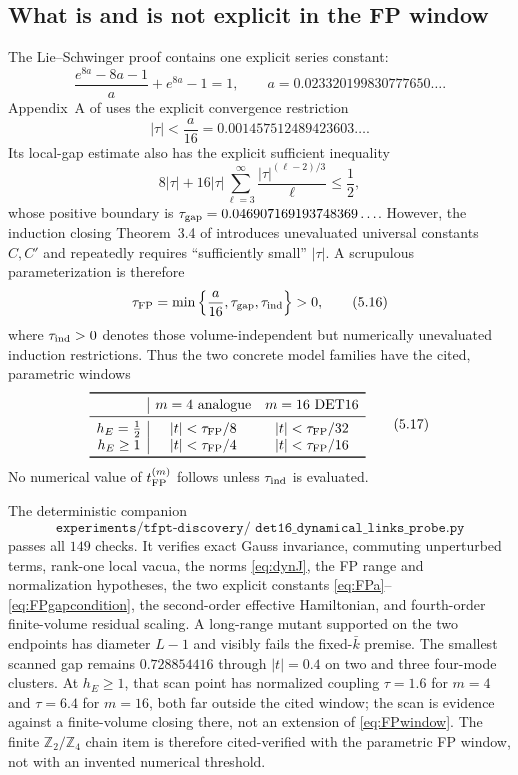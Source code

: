 \documentclass[11pt]{article}
\theoremstyle{remark}
\begin{document}
\subsection{What is and is not explicit in the FP window}

The Lie--Schwinger proof contains one explicit series constant:
\[
 \frac{e^{8a}-8a-1}{a}+e^{8a}-1=1,\qquad
 a=0.023320199830777650\ldots .
\tag{5.14}\label{eq:FPa}
\]
Appendix~A of \cite{FP2020} uses the explicit convergence restriction
\[
 |\tau|<\frac a{16}
 =0.001457512489423603\ldots .
\]
Its local-gap estimate also has the explicit sufficient inequality
\[
 8|\tau|+16|\tau|
 \sum_{\ell=3}^{\infty}
 \frac{|\tau|^{(\ell-2)/3}}{\ell}\leq\frac12,
\tag{5.15}\label{eq:FPgapcondition}
\]
whose positive boundary is
$\tau_{\rm gap}=0.046907169193748369\ldots$.
However, the induction closing Theorem~3.4 of \cite{FP2020} introduces
unevaluated universal constants $C,C'$ and repeatedly requires
``sufficiently small'' $|\tau|$.  A scrupulous parameterization is
therefore
\[
 \tau_{\rm FP}
 =\min\left\{\frac a{16},\tau_{\rm gap},\tau_{\rm ind}\right\}>0,
\tag{5.16}\label{eq:FPparametric}
\]
where $\tau_{\rm ind}>0$ denotes those volume-independent but
numerically unevaluated induction restrictions.  Thus the two concrete
model families have the cited, parametric windows
\[
\begin{array}{c|cc}
\toprule
&m=4\ \text{analogue}&m=16\ \text{DET16}\\
\midrule
h_E=\tfrac12&|t|<\tau_{\rm FP}/8&|t|<\tau_{\rm FP}/32\\
h_E\geq1&|t|<\tau_{\rm FP}/4&|t|<\tau_{\rm FP}/16\\
\bottomrule
\end{array}
\tag{5.17}\label{eq:FPwindows}
\]
No numerical value of $t_{\rm FP}^{(m)}$ follows unless
$\tau_{\rm ind}$ is evaluated.

The deterministic companion
\[
 \texttt{experiments/tfpt-discovery/
 det16\_dynamical\_links\_probe.py}
\]
passes all $149$ checks.  It verifies exact Gauss invariance, commuting
unperturbed terms, rank-one local vacua, the norms
\eqref{eq:dynJ}, the FP range and normalization hypotheses, the two
explicit constants \eqref{eq:FPa}--\eqref{eq:FPgapcondition}, the
second-order effective Hamiltonian, and fourth-order finite-volume
residual scaling.  A long-range mutant supported on the two endpoints
has diameter $L-1$ and visibly fails the fixed-$\bar k$ premise.
The smallest scanned gap remains $0.728854416$ through $|t|=0.4$ on
two and three four-mode clusters.  At $h_E\geq1$, that scan point has
normalized coupling $\tau=1.6$ for $m=4$ and $\tau=6.4$ for $m=16$,
both far outside the cited window; the scan is evidence against a
finite-volume closing there, not an extension of
\eqref{eq:FPwindow}.  The finite $\mathbb Z_2/\mathbb Z_4$ chain item is
therefore cited-verified with the parametric FP window, not with an
invented numerical threshold.
\end{document}
